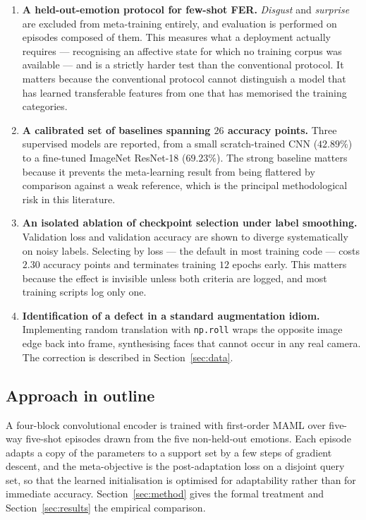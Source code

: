 \documentclass[11pt,a4paper]{article}
\begin{document}
\begin{enumerate}\itemsep3pt
\item \textbf{A held-out-emotion protocol for few-shot FER.} \emph{Disgust} and
\emph{surprise} are excluded from meta-training entirely, and evaluation is
performed on episodes composed of them. This measures what a deployment
actually requires --- recognising an affective state for which no training
corpus was available --- and is a strictly harder test than the conventional
protocol. It matters because the conventional protocol cannot distinguish a
model that has learned transferable features from one that has memorised the
training categories.

\item \textbf{A calibrated set of baselines spanning $26$ accuracy points.}
Three supervised models are reported, from a small scratch-trained CNN
($42.89\%$) to a fine-tuned ImageNet ResNet-18 ($69.23\%$). The strong baseline
matters because it prevents the meta-learning result from being flattered by
comparison against a weak reference, which is the principal methodological risk
in this literature.

\item \textbf{An isolated ablation of checkpoint selection under label
smoothing.} Validation loss and validation accuracy are shown to diverge
systematically on noisy labels. Selecting by loss --- the default in most
training code --- costs $2.30$ accuracy points and terminates training $12$
epochs early. This matters because the effect is invisible unless both criteria
are logged, and most training scripts log only one.

\item \textbf{Identification of a defect in a standard augmentation idiom.}
Implementing random translation with \texttt{np.roll} wraps the opposite image
edge back into frame, synthesising faces that cannot occur in any real camera.
The correction is described in Section~\ref{sec:data}.
\end{enumerate}

\subsection{Approach in outline}
A four-block convolutional encoder is trained with first-order MAML over
five-way five-shot episodes drawn from the five non-held-out emotions. Each
episode adapts a copy of the parameters to a support set by a few steps of
gradient descent, and the meta-objective is the post-adaptation loss on a
disjoint query set, so that the learned initialisation is optimised for
adaptability rather than for immediate accuracy. Section~\ref{sec:method}
gives the formal treatment and Section~\ref{sec:results} the empirical
comparison.
\end{document}
